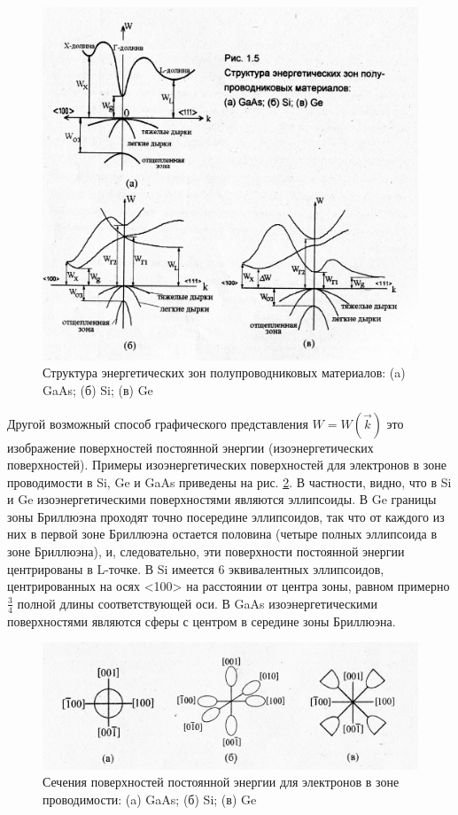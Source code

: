 \begin{figure}[h!]
	\centering
	\includegraphics[width = .9\linewidth]{img/15.jpg}
	\caption{Структура энергетических зон полупроводниковых материалов: (a) GaAs; (б) Si; (в) Ge}
	\label{fig:1.5}
\end{figure}

Другой возможный способ графического представления $W=W(\vec{k})$ это изображение поверхностей постоянной энергии
(изоэнергетических поверхностей). Примеры изоэнергетических поверхностей для электронов в зоне проводимости в Si, Ge и
GaAs приведены на рис. \ref{fig:1.6}. В частности, видно, что в Si и Ge изоэнергетическими поверхностями являются эллипсоиды. В Ge
границы зоны Бриллюэна проходят точно посередине эллипсоидов, так что от каждого из них в первой зоне Бриллюэна остается
половина (четыре полных эллипсоида в зоне Бриллюэна), и, следовательно, эти поверхности постоянной энергии центрированы
в L-точке. В Si имеется 6 эквивалентных эллипсоидов, центрированных на осях <100> на расстоянии от центра зоны, равном
примерно $\frac{3}{4}$ полной длины соответствующей оси. В GaAs изоэнергетическими поверхностями являются сферы с центром в середине
зоны Бриллюэна.

\begin{figure}[h!]
	\centering
	\includegraphics[width = .8\linewidth]{img/16.jpg}
	\caption{Сечения поверхностей постоянной энергии для электронов в зоне проводимости: (a) GaAs; (б) Si; (в) Ge}
	\label{fig:1.6}
\end{figure}

